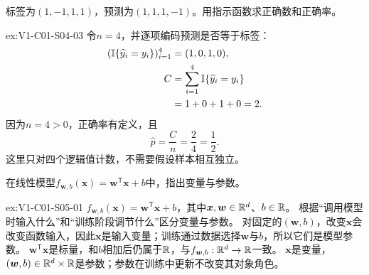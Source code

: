 \begin{SLChapterExercisePairSection}
\begin{exercise}[指示计数]\label{ex:V1-C01-S04-03}
标签为$(1,-1,1,1)$，预测为$(1,1,1,-1)$。用指示函数求正确数和正确率。
\end{exercise}
\label{sol:V1-C01-S04-03}
\begin{chapterexercisesolution}{ex:V1-C01-S04-03}
令$n=4$，并逐项编码预测是否等于标签：
\[
\begin{aligned}
(\mathbb{I}\{\widehat y_i=y_i\})_{i=1}^{4}
&=(1,0,1,0),\\
C
&=\sum_{i=1}^{4}\mathbb{I}\{\widehat y_i=y_i\}\\
&=1+0+1+0=2.
\end{aligned}
\]
因为$n=4>0$，正确率有定义，且
\[
\widehat p=\frac{C}{n}=\frac{2}{4}=\frac12.
\]
这里只对四个逻辑值计数，不需要假设样本相互独立。
\end{chapterexercisesolution}

\begin{exercise}[角色识别]\label{ex:V1-C01-S05-01}
在线性模型$f_{\boldsymbol{w},b}(\boldsymbol{x})=\boldsymbol{w}^{\mathsf T}\boldsymbol{x}+b$中，指出变量与参数。
\end{exercise}
\label{sol:V1-C01-S05-01}
\begin{chapterexercisesolution}{ex:V1-C01-S05-01}
\SolGiven $f_{\boldsymbol{w},b}(\boldsymbol{x})=\boldsymbol{w}^{\mathsf T}\boldsymbol{x}+b$，其中$\boldsymbol{x},\boldsymbol{w}\in\mathbb{R}^d$、$b\in\mathbb{R}$。
\SolPlan 根据“调用模型时输入什么”和“训练阶段调节什么”区分变量与参数。
\SolDerive 对固定的$(\boldsymbol{w},b)$，改变$\boldsymbol{x}$会改变函数输入，因此$\boldsymbol{x}$是输入变量；训练通过数据选择$\boldsymbol{w}$与$b$，所以它们是模型参数。
\SolCheck $\boldsymbol{w}^{\mathsf T}\boldsymbol{x}$是标量，和$b$相加后仍属于$\mathbb{R}$，与$f_{\boldsymbol w,b}:\mathbb{R}^d\to\mathbb{R}$一致。
\SolAnswer $\boldsymbol{x}$是变量，$(\boldsymbol{w},b)\in\mathbb{R}^d\times\mathbb{R}$是参数；参数在训练中更新不改变其对象角色。
\end{chapterexercisesolution}


\end{SLChapterExercisePairSection}

